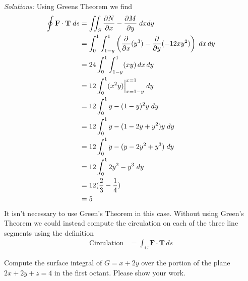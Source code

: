     \ifnum {} {\color{DarkBlue}  \textit{Solutions:} 
    Using Greens Theorem we find
    \begin{align*}
        \oint \mathbf F \cdot \mathbf{T} \;ds 
        &= \iint_S  \frac{\partial N}{ \partial x} - \frac{\partial M}{\partial y} \;dx dy 
        \\ 
        &= \int_0^1\int_{1-y}^{1}  \left( \frac{\partial}{\partial x} (y^3) - \frac{\partial}{\partial y}(-12xy^2) \right) \;dx \, dy 
        \\ 
        &= 24 \int_0^1 \int_{1-y}^{1} ( xy ) \, dx\, dy \\ 
        &= 12 \int_0^1 ( x^2y )\Big\vert_{x=1-y}^{x=1} \;dy \\ 
        &= 12 \int_0^1 y - (1-y)^2y \;dy \\ 
        &= 12 \int_0^1 y - (1-2y+y^2)y \;dy \\ 
        &= 12 \int_0^1 y - (y-2y^2+y^3) \;dy \\ 
        &= 12 \int_0^1 2y^2 - y^3 \;dy \\ 
        &= 12 ( \frac23 - \frac14) \\
        &= 5
    \end{align*}
    It isn't necessary to use Green's Theorem in this case. Without using Green's Theorem we could instead compute the circulation on each of the three line segments using the definition
    \begin{align}
        \text{Circulation} &= \int_C \mathbf F \cdot \mathbf T \, ds
    \end{align}
    } 
   \else
      
   \fi
    
\fi





\ifnum {}

    \question[4]{} Compute the surface integral of $G = x + 2y $ over the portion of the plane $2x + 2y + z = 4$ in the first octant. Please show your work.  
    
